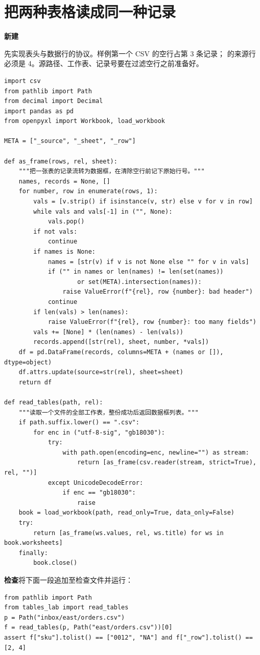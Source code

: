 \documentclass[UTF8,11pt,a4paper,fontset=fandol]{ctexart}
\newcommand{\file}[1]{\texttt{\detokenize{#1}}}
\newcommand{\stepfile}[2]{\textbf{#1}\quad\file{#2}\par}
\begin{document}
\section{把两种表格读成同一种记录}\label{lab:tables}
\stepfile{新建}{tables_lab.py}
先实现表头与数据行的协议。样例第一个 CSV 的空行占第 3 条记录；\file{NA} 的来源行必须是 4。源路径、工作表、记录号要在过滤空行之前准备好。
\begin{lstlisting}[style=lab]
import csv
from pathlib import Path
from decimal import Decimal
import pandas as pd
from openpyxl import Workbook, load_workbook

META = ["_source", "_sheet", "_row"]

def as_frame(rows, rel, sheet):
    """把一张表的记录流转为数据框，在清除空行前记下原始行号。"""
    names, records = None, []
    for number, row in enumerate(rows, 1):
        vals = [v.strip() if isinstance(v, str) else v for v in row]
        while vals and vals[-1] in ("", None):
            vals.pop()
        if not vals:
            continue
        if names is None:
            names = [str(v) if v is not None else "" for v in vals]
            if ("" in names or len(names) != len(set(names))
                    or set(META).intersection(names)):
                raise ValueError(f"{rel}, row {number}: bad header")
            continue
        if len(vals) > len(names):
            raise ValueError(f"{rel}, row {number}: too many fields")
        vals += [None] * (len(names) - len(vals))
        records.append([str(rel), sheet, number, *vals])
    df = pd.DataFrame(records, columns=META + (names or []), dtype=object)
    df.attrs.update(source=str(rel), sheet=sheet)
    return df

def read_tables(path, rel):
    """读取一个文件的全部工作表，整份成功后返回数据框列表。"""
    if path.suffix.lower() == ".csv":
        for enc in ("utf-8-sig", "gb18030"):
            try:
                with path.open(encoding=enc, newline="") as stream:
                    return [as_frame(csv.reader(stream, strict=True), rel, "")]
            except UnicodeDecodeError:
                if enc == "gb18030":
                    raise
    book = load_workbook(path, read_only=True, data_only=False)
    try:
        return [as_frame(ws.values, rel, ws.title) for ws in book.worksheets]
    finally:
        book.close()
\end{lstlisting}
\textbf{检查}\quad 将下面一段追加至检查文件并运行：
\begin{lstlisting}[style=lab]
from pathlib import Path
from tables_lab import read_tables
p = Path("inbox/east/orders.csv")
f = read_tables(p, Path("east/orders.csv"))[0]
assert f["sku"].tolist() == ["0012", "NA"] and f["_row"].tolist() == [2, 4]
\end{lstlisting}
\end{document}
